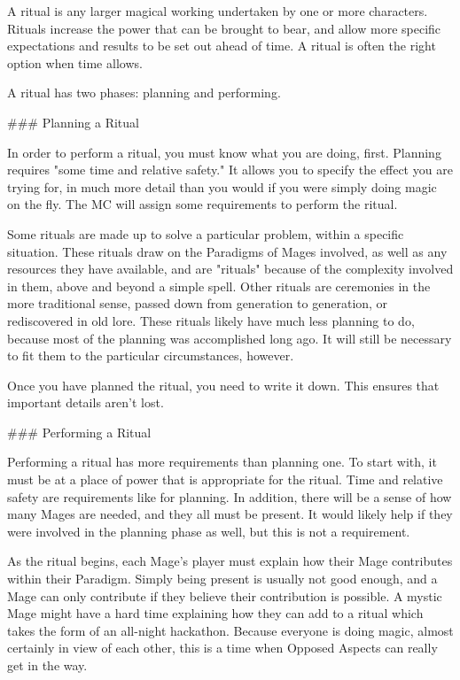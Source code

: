 \documentclass[
  oneside,
  statementpaper,
  9pt]{memoir}
\begin{document}
\begin{Player}

A ritual is any larger magical working undertaken by one or more characters. Rituals increase the power that can be brought to bear, and allow more specific expectations and results to be set out ahead of time. A ritual is often the right option when time allows.

A ritual has two phases: planning and performing.

### Planning a Ritual

In order to perform a ritual, you must know what you are doing, first. Planning requires "some time and relative safety." It allows you to specify the effect you are trying for, in much more detail than you would if you were simply doing magic on the fly. The MC will assign some requirements to perform the ritual.

Some rituals are made up to solve a particular problem, within a specific situation. These rituals draw on the Paradigms of Mages involved, as well as any resources they have available, and are "rituals" because of the complexity involved in them, above and beyond a simple spell. Other rituals are ceremonies in the more traditional sense, passed down from generation to generation, or rediscovered in old lore. These rituals likely have much less planning to do, because most of the planning was accomplished long ago. It will still be necessary to fit them to the particular circumstances, however.

Once you have planned the ritual, you need to write it down. This ensures that important details aren’t lost.

### Performing a Ritual

Performing a ritual has more requirements than planning one. To start with, it must be at a place of power that is appropriate for the ritual. Time and relative safety are requirements like for planning. In addition, there will be a sense of how many Mages are needed, and they all must be present. It would likely help if they were involved in the planning phase as well, but this is not a requirement.

As the ritual begins, each Mage’s player must explain how their Mage contributes within their Paradigm. Simply being present is usually not good enough, and a Mage can only contribute if they believe their contribution is possible. A mystic Mage might have a hard time explaining how they can add to a ritual which takes the form of an all-night hackathon. Because everyone is doing magic, almost certainly in view of each other, this is a time when Opposed Aspects can really get in the way.


\end{Player}
\end{document}
